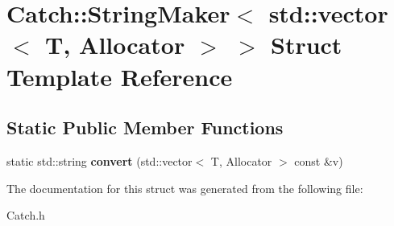 \hypertarget{struct_catch_1_1_string_maker_3_01std_1_1vector_3_01_t_00_01_allocator_01_4_01_4}{\section{Catch\-:\-:String\-Maker$<$ std\-:\-:vector$<$ T, Allocator $>$ $>$ Struct Template Reference}
\label{struct_catch_1_1_string_maker_3_01std_1_1vector_3_01_t_00_01_allocator_01_4_01_4}
}
\subsection*{Static Public Member Functions}
\begin{DoxyCompactItemize}
\item 
\hypertarget{struct_catch_1_1_string_maker_3_01std_1_1vector_3_01_t_00_01_allocator_01_4_01_4_adc7dc716733cea8777497257ae22e62d}{static std\-::string {\bfseries convert} (std\-::vector$<$ T, Allocator $>$ const \&v)}\label{struct_catch_1_1_string_maker_3_01std_1_1vector_3_01_t_00_01_allocator_01_4_01_4_adc7dc716733cea8777497257ae22e62d}

\end{DoxyCompactItemize}


The documentation for this struct was generated from the following file\-:\begin{DoxyCompactItemize}
\item 
Catch.\-h\end{DoxyCompactItemize}
